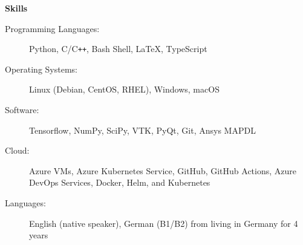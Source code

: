 \documentclass[letterpaper,11pt]{article}
\newcommand{\resheading}[1]{{\large \colorbox{mygrey}{\begin{minipage}{\textwidth}{\textbf{#1 \vphantom{p\^{E}}}}\end{minipage}}}}
\begin{document}
\resheading{Skills}

\begin{description}
\item[Programming Languages:] Python, C/C{}\verb!++!, Bash Shell, \LaTeX, TypeScript
\item[Operating Systems:] Linux (Debian, CentOS, RHEL), Windows, macOS
\item[Software:] Tensorflow, NumPy, SciPy, VTK, PyQt, Git, Ansys MAPDL
\item[Cloud:] Azure VMs, Azure Kubernetes Service, GitHub, GitHub Actions, Azure DevOps Services, Docker, Helm, and Kubernetes
\item [Languages:] English (native speaker), German (B1/B2) from living in Germany for 4 years
\end{description}

\newpage
\end{document}
